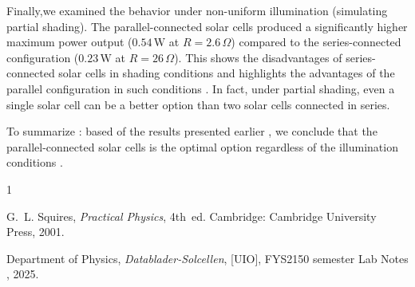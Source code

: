 \documentclass[12pt]{article}
\begin{document}
Finally,we examined the behavior  under non-uniform illumination (simulating partial shading). 
The parallel-connected solar cells produced a significantly higher maximum power output (\( 0.54 \, \text{W} \) at \( R = 2.6 \, \Omega \)) compared to the series-connected configuration (\( 0.23 \, \text{W} \) at \( R = 26 \, \Omega \)). This shows  the disadvantages of series-connected solar cells in shading conditions and highlights the advantages  of the parallel configuration in such conditions .
In fact, under partial shading, even a single solar cell can be a better option than  two solar cells connected in series.

To summarize : based of the results presented earlier  , we conclude that the parallel-connected solar cells is the optimal option regardless of the illumination conditions .


\begin{thebibliography}{1}

G.~L. Squires, \emph{Practical Physics}, 4th~ed. Cambridge: Cambridge University Press, 2001.



Department of Physics, \emph{Datablader-Solcellen}, [UIO], FYS2150 semester Lab Notes , 2025.

\end{thebibliography}
\end{document}
